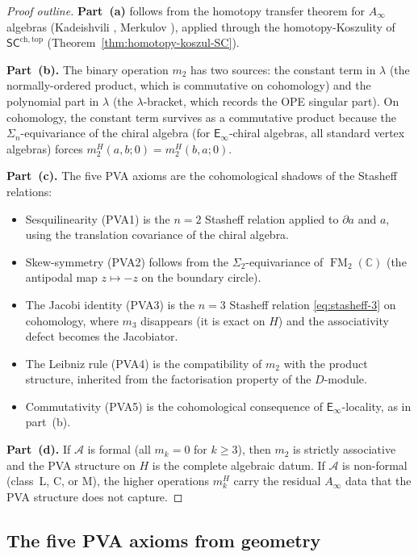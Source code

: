 \documentclass[11pt,reqno]{amsart}
\theoremstyle{definition}
\theoremstyle{remark}
\newcommand{\cA}{\mathcal{A}}
\newcommand{\CC}{\mathbb{C}}
\newcommand{\Ainf}{A_{\infty}}
\newcommand{\Einf}{\mathsf{E}_{\infty}}
\newcommand{\SCchtop}{\mathsf{SC}^{\mathrm{ch,top}}}
\DeclareMathOperator{\FM}{FM}
\numberwithin{equation}{section}
\begin{document}
\begin{proof}[Proof outline]
\textbf{Part~(a)} follows from the homotopy transfer theorem
for $\Ainf$ algebras (Kadeishvili \cite{Kad82}, Merkulov
\cite{Mer99}), applied through the homotopy-Koszulity of
$\SCchtop$ (Theorem~\ref{thm:homotopy-koszul-SC}).

\textbf{Part~(b).}  The binary operation $m_2$ has two sources:
the constant term in $\lambda$ (the normally-ordered product,
which is commutative on cohomology) and the polynomial part in
$\lambda$ (the $\lambda$-bracket, which records the OPE
singular part).  On cohomology, the constant term survives as a
commutative product because the $\Sigma_n$-equivariance of the
chiral algebra (for $\Einf$-chiral algebras, all standard vertex
algebras) forces $m_2^H(a,b;0) = m_2^H(b,a;0)$.

\textbf{Part~(c).}  The five PVA axioms are the cohomological
shadows of the Stasheff relations:
\begin{itemize}[nosep]
\item Sesquilinearity (PVA1) is the $n=2$ Stasheff relation
  applied to $\partial a$ and $a$, using the translation
  covariance of the chiral algebra.
\item Skew-symmetry (PVA2) follows from the $\Sigma_2$-equivariance
  of $\FM_2(\CC)$ (the antipodal map $z \mapsto -z$ on the
  boundary circle).
\item The Jacobi identity (PVA3) is the $n=3$ Stasheff relation
  \eqref{eq:stasheff-3} on cohomology, where $m_3$ disappears
  (it is exact on $H$) and the associativity defect becomes the
  Jacobiator.
\item The Leibniz rule (PVA4) is the compatibility of $m_2$
  with the product structure, inherited from the factorisation
  property of the $D$-module.
\item Commutativity (PVA5) is the cohomological consequence of
  $\Einf$-locality, as in part~(b).
\end{itemize}

\textbf{Part~(d).}  If $\cA$ is formal (all $m_k = 0$ for
$k \geq 3$), then $m_2$ is strictly associative and the PVA
structure on $H$ is the complete algebraic datum.  If $\cA$ is
non-formal (class~L, C, or M), the higher operations $m_k^H$
carry the residual $\Ainf$ data that the PVA structure does not
capture.
\end{proof}

\subsection{The five PVA axioms from geometry}
\label{subsec:five-axioms-geometry}
\end{document}
